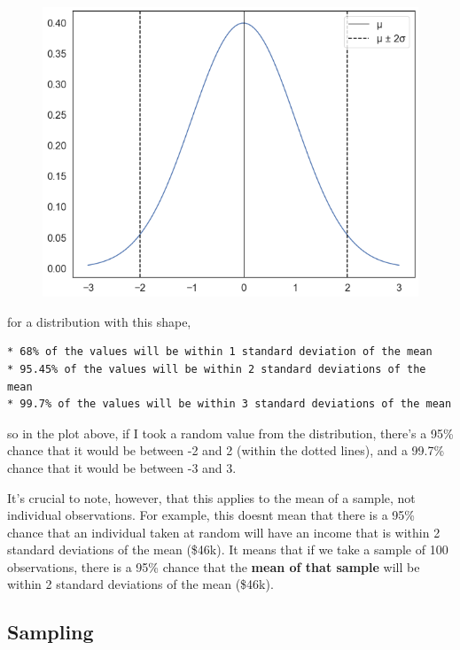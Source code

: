 \documentclass[
  letterpaper,
  DIV=11,
  numbers=noendperiod]{scrreprt}
\begin{document}
\begin{figure}[H]

{\centering \includegraphics{notebooks/W05. Distributions and Basic Statistics_files/figure-pdf/cell-22-output-1.png}

}

\end{figure}

for a distribution with this shape,

\begin{verbatim}
* 68% of the values will be within 1 standard deviation of the mean
* 95.45% of the values will be within 2 standard deviations of the mean
* 99.7% of the values will be within 3 standard deviations of the mean
\end{verbatim}

so in the plot above, if I took a random value from the distribution,
there's a 95\% chance that it would be between -2 and 2 (within the
dotted lines), and a 99.7\% chance that it would be between -3 and 3.

It's crucial to note, however, that this applies to the mean of a
sample, not individual observations. For example, this doesnt mean that
there is a 95\% chance that an individual taken at random will have an
income that is within 2 standard deviations of the mean (\$46k). It
means that if we take a sample of 100 observations, there is a 95\%
chance that the \textbf{mean of that sample} will be within 2 standard
deviations of the mean (\$46k).

\hypertarget{sampling}{%
\subsection{Sampling}\label{sampling}}
\end{document}
